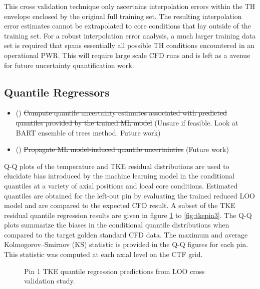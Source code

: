 This cross validation technique only ascertains interpolation errors within the TH envelope enclosed by the original full training set.  The resulting interpolation error estimates cannot be extrapolated to core conditions that lay outside of the training set.  For a robust interpolation error analysis, a much larger training data set is required
that spans essentially all possible TH conditions encountered in an operational PWR.  This will require large scale CFD runs and is left as a avenue for future uncertainty quantification work.

\subsection{Quantile Regressors}

\begin{itemize}   
    \item (\xmark) \sout{Compute quantile uncertainty estimates associated with predicted quantiles provided by the trained ML model} (Unsure if feasible.  Look at BART ensemble of trees method. Future work)
    \item (\xmark) \sout{Propagate ML model-induced quantile uncertainties} (Future work)
\end{itemize}


Q-Q plots of the  temperature and TKE residual distributions are used to elucidate bias introduced by the machine learning model in the conditional quantiles at a variety of axial positions and local core conditions.  Estimated quantiles are obtained for the left-out pin by evaluating the trained reduced LOO model and are compared to the expected CFD result.
A subset of the TKE residual quantile regression results are given in figure \ref{fig:tkepin1} to \ref{fig:tkepin3}.  The Q-Q plots summarize the biases in the conditional quantile distributions when compared to the target golden standard CFD data.  The maximum and average Kolmogorov–Smirnov (KS) statistic is provided in the Q-Q figures for each pin.  This statistic was computed at each axial level on the CTF grid.

\begin{figure}[H]%
    \centering
    \qquad
    \caption[Q-Q LOO TKE pin 1 results.]{Pin 1 TKE quantile regression predictions from LOO cross validation study.}%
    \label{fig:tkepin1}%
\end{figure}

